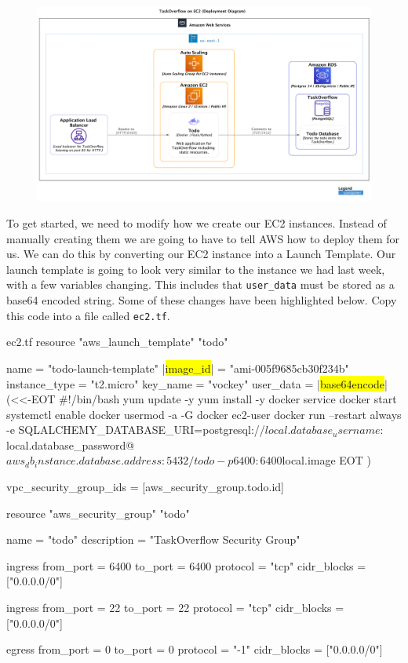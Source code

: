 \documentclass{csse4400}
\begin{document}
\begin{figure}[H]
  \includegraphics[width=\textwidth]{diagrams/ec2deployment}
\end{figure}

To get started, we need to modify how we create our EC2 instances.
Instead of manually creating them we are going to have to tell AWS how to deploy them for us.
We can do this by converting our EC2 instance into a Launch Template.
Our launch template is going to look very similar to the instance we had last week, with a few variables changing.
This includes that \texttt{user\_data} must be stored as a base64 encoded string.
Some of these changes have been highlighted below. Copy this code into a file called \texttt{ec2.tf}.


\begin{code}[language=terraform,numbers=none,escapechar=|,keepspaces=true]{ec2.tf}
resource "aws_launch_template" "todo" {
  name          = "todo-launch-template"
  |\colorbox{yellow}{image\_id}|     = "ami-005f9685cb30f234b"
  instance_type = "t2.micro"
  key_name      = "vockey"
  user_data     = |\colorbox{yellow}{base64encode}|(<<-EOT
    #!/bin/bash
    yum update -y
    yum install -y docker
    service docker start
    systemctl enable docker
    usermod -a -G docker ec2-user 
    docker run --restart always -e SQLALCHEMY_DATABASE_URI=postgresql://${local.database_username}:${local.database_password}@${aws_db_instance.database.address}:5432/todo -p 6400:6400 ${local.image}
EOT
  )

  vpc_security_group_ids = [aws_security_group.todo.id]
}


resource "aws_security_group" "todo" {
  name          = "todo"
  description   = "TaskOverflow Security Group"

  ingress {
    from_port   = 6400
    to_port     = 6400
    protocol    = "tcp"
    cidr_blocks = ["0.0.0.0/0"]
  }

  ingress {
    from_port   = 22
    to_port     = 22
    protocol    = "tcp"
    cidr_blocks = ["0.0.0.0/0"]
  }

  egress {
    from_port   = 0
    to_port     = 0
    protocol    = "-1"
    cidr_blocks = ["0.0.0.0/0"]
  }
}
\end{code}
\end{document}
